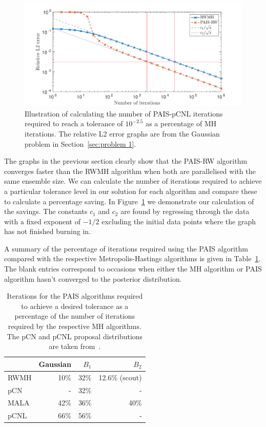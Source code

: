 \documentclass[final]{siamltex}
\begin{document}
\begin{figure}
\begin{center}
\includegraphics[width=\textwidth]{"figures/calc_saving"}
\caption{Illustration of calculating the number of PAIS-pCNL iterations required to reach a tolerance of $10^{-2.5}$ as a percentage of MH iterations. The relative L2 error graphs are from the Gaussian problem in Section~\ref{sec:problem 1}.}
\label{fig:calc_saving}
\end{center}
\end{figure}

The graphs in the previous section clearly show that the PAIS-RW algorithm converges faster than the RWMH algorithm when both are parallelised with the same ensemble size. We can calculate the number of iterations required to achieve a particular tolerance level in our solution for each algorithm and compare these to calculate a percentage saving. In Figure~\ref{fig:calc_saving} we demonstrate our calculation of the savings. The constants $c_1$ and $c_2$ are found by regressing through the data with a fixed exponent of $-1/2$ excluding the initial data points where the graph has not finished burning in.

A summary of the percentage of iterations required using the PAIS algorithm compared with the respective Metropolis-Hastings algorithms is given in Table~\ref{table:calc_savings}. The blank entries correspond to occasions when either the MH algorithm or PAIS algorithm hasn't converged to the posterior distribution.

\begin{table}[!h]
\centering
\begin{tabular}{|l|r|r|r|}
\hline
		& Gaussian & $B_1$ & $B_2$ \\ \hline
	RWMH & 10\% & 32\% & 12.6\% (scout) \\
	pCN & - & 32\% & - \\
	MALA & 42\% & 36\% & 40\% \\
	pCNL & 66\% & 56\% & - \\ \hline
\end{tabular}
\caption{Iterations for the PAIS algorithms required to achieve a desired tolerance as a percentage of the number of iterations required by the respective MH algorithms. The pCN and pCNL proposal distributions are taken from~\cite{cotter2013mcmc}.}
\label{table:calc_savings}
\end{table}
\end{document}

